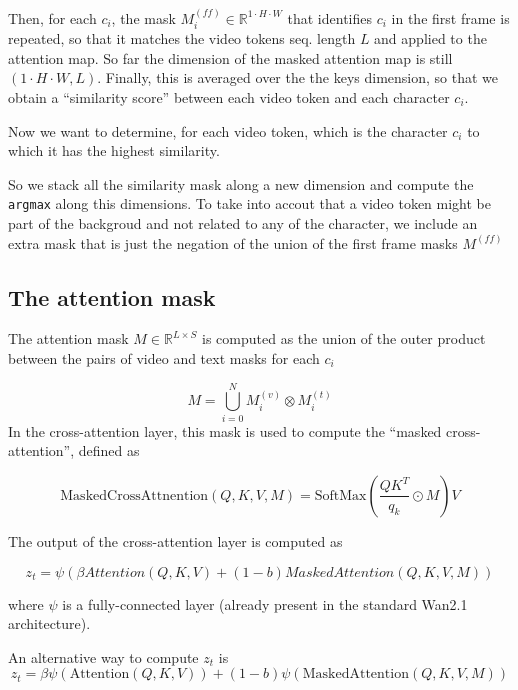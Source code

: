 \documentclass{article}
\begin{document}
Then, for each $c_i$, the mask $M^{(ff)}_i \in \mathbb{R}^{1 \cdot H \cdot W}$ that identifies $c_i$ in the first frame is repeated, so that it matches the video tokens seq. length $L$ and applied to the attention map. So far the dimension of the masked attention map is still $(1 \cdot H \cdot W, L)$. Finally, this is averaged over the the keys dimension, so that we obtain a ``similarity score'' between each video token and each character $c_i$.

Now we want to determine, for each video token, which is the character $c_i$ to which it has the highest similarity.

So we stack all the similarity mask along a new dimension and compute the \texttt{argmax} along this dimensions. To take into accout that a video token might be part of the backgroud and not related to any of the character, we include an extra mask that is just the negation of the union of the first frame masks $M^{(ff)}$


\subsection{The attention mask}
The attention mask $M \in \mathbb{R}^{L \times S}$ is computed as the union of the outer product between the pairs of video and text masks for each $c_i$

\[
M = \bigcup_{i=0}^{N} M^{(v)}_i \otimes M^{(t)}_i
\]
In the cross-attention layer, this mask is used to compute the ``masked cross-attention'', defined as 

\[
\mathrm{Masked CrossAttnention}(Q, K, V, M) = \mathrm{SoftMax}\left(\frac{Q K^T }{q_k}\odot M\right) V
\]

The  output of the cross-attention layer is computed as

\[
z_t = \psi(\beta Attention(Q, K, V) + (1 - b) MaskedAttention(Q, K, V, M))
\]

where $\psi$ is a fully-connected layer (already present in the standard Wan2.1 architecture).

An alternative way to compute $z_t$ is 
\[
z_t = \beta \psi(\mathrm{Attention}(Q, K, V)) + (1 - b) \psi( \mathrm{MaskedAttention}(Q, K, V, M))
\]
\end{document}
